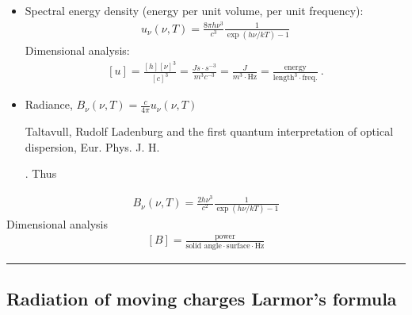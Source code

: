 \documentclass[letterpaper,10pt,english]{jupyterBook}
\begin{document}
\begin{itemize}
\item {} 
\sphinxAtStartPar
Spectral energy density (energy per unit volume, per unit frequency):
\begin{equation*}
\begin{split}u_{\nu}(\nu, T) = \frac{8 \pi h \nu^3}{c^3} \frac{1}{\exp(h \nu/kT) - 1}\end{split}
\end{equation*}
\sphinxAtStartPar
Dimensional analysis:
\begin{equation*}
\begin{split}[u] = \frac{[h][\nu]^3}{[c]^3} = \frac{J s \cdot s^{-3}}{ m^3 c^{-3}} = \frac{J}{ m^3 \cdot \text{Hz}} = \frac{\text{energy}}{\text{length}^3 \cdot \text{freq.}} \ .\end{split}
\end{equation*}
\item {} 
\sphinxAtStartPar
Radiance, \(B_{\nu}(\nu, T) = \frac{c}{4 \pi} u_{\nu}(\nu, T)\)  %
\begin{footnote}[1]\sphinxAtStartFootnote
Taltavull, Rudolf Ladenburg and the first quantum interpretation of optical dispersion, Eur. Phys. J. H.
%
\end{footnote}. Thus

\end{itemize}
\begin{equation*}
\begin{split}B_{\nu}(\nu, T) = \frac{2 h \nu^3}{c^2} \frac{1}{\exp(h \nu/kT) - 1}\end{split}
\end{equation*}
\sphinxAtStartPar
Dimensional analysis
\begin{equation*}
\begin{split}[B] = \frac{\text{power}}{\text{solid angle} \cdot \text{surface} \cdot \text{Hz}}\end{split}
\end{equation*}

\bigskip\hrule\bigskip


\sphinxstepscope


\subsection{Radiation of moving charges \sphinxhyphen{} Larmor’s formula}
\label{\detokenize{ch/quantum-mechanics/history/larmor-formula:radiation-of-moving-charges-larmor-s-formula}}\label{\detokenize{ch/quantum-mechanics/history/larmor-formula:moving-charge-radiation}}\label{\detokenize{ch/quantum-mechanics/history/larmor-formula::doc}}
\end{document}

